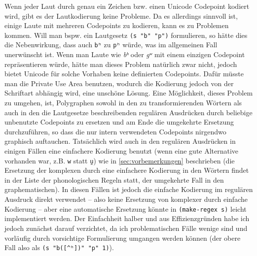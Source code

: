 \documentclass[12pt,a4paper,normalheadings]{scrartcl}
\def\bel#1{\mbox{\textit{#1}}}
\def\tt#1{\texttt{#1}}
\begin{document}
Wenn jeder Laut durch genau ein Zeichen bzw. einen Unicode Codepoint kodiert wird,
gibt es der Lautkodierung keine Probleme.
Da es allerdings sinnvoll ist,
einige Laute mit mehreren Codepoints zu kodieren,
kann es zu Problemen kommen.
Will man bspw. ein Lautgesetz \tt{(s "b" "p")} formulieren,
so hätte dies die Nebenwirkung,
dass auch \tt{bʰ} zu \tt{pʰ} würde,
was im allgemeinen Fall unerwünscht ist.
Wenn man Laute wie \bel{bʰ} oder \bel{gʷ} mit einem einzigen Codepoint
repräsentieren würde,
hätte man dieses Problem natürlich zwar nicht,
jedoch bietet Unicode für solche Vorhaben keine definierten Codepoints.
Dafür müsste man die Private Use Area benutzen,
wodurch die Kodierung jedoch von der Schriftart abhängig wird,
eine unschöne Lösung.
Eine Möglichkeit, dieses Problem zu umgehen, ist,
Polygraphen sowohl in den zu transformierenden Wörtern als auch in den
die Lautgesetze beschreibenden regulären Ausdrücken durch
beliebige unbenutzte Codepoints zu ersetzen
und am Ende die umgekehrte Ersetzung durchzuführen,
so dass die nur intern verwendeten Codepoints nirgendwo graphisch auftauchen.
Tatsächlich wird auch in den regulären Ausdrücken
in einigen Fällen eine einfachere Kodierung benutzt
(wenn eine gute Alternative vorhanden war, z.B. \tt{w} statt \tt{u̯}) wie in
\ref{sec:vorbemerkungen} beschrieben
(die Ersetzung der komplexen durch eine einfachere Kodierung in den Wörtern
findet in der Liste der phonologischen Regeln statt,
der umgekehrte Fall in den graphematischen).
In diesen Fällen ist jedoch die einfache Kodierung
im regulären Ausdruck direkt verwendet --
also keine Ersetzung von komplexer durch einfache Kodierung --
aber eine automatische Ersetzung könnte in \tt{(make-regex s)}
leicht implementiert werden.
Der Einfachheit halber und aus Effizienzgründen habe ich jedoch zunächst
darauf verzichtet,
da ich problematischen Fälle wenige sind und vorläufig durch vorsichtige
Formulierung umgangen werden können
(der obere Fall also als \tt{(s "b([\textasciicircum{}ʰ])" "p" 1)}).

\end{document}
